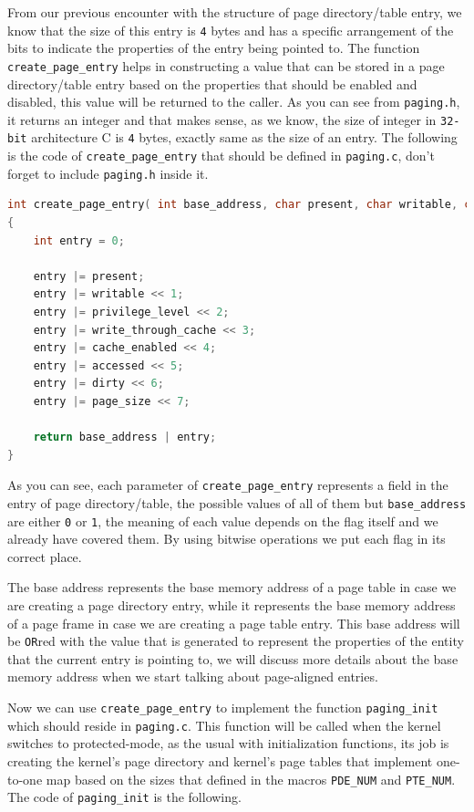 From our previous encounter with the structure of page directory/table
entry, we know that the size of this entry is \lstinline!4! bytes and
has a specific arrangement of the bits to indicate the properties of the
entry being pointed to. The function \lstinline!create_page_entry! helps
in constructing a value that can be stored in a page directory/table
entry based on the properties that should be enabled and disabled, this
value will be returned to the caller. As you can see from
\lstinline!paging.h!, it returns an integer and that makes sense, as we
know, the size of integer in \lstinline!32-bit! architecture C is
\lstinline!4! bytes, exactly same as the size of an entry. The following
is the code of \lstinline!create_page_entry! that should be defined in
\lstinline!paging.c!, don't forget to include \lstinline!paging.h!
inside it.

\begin{lstlisting}[language=C]
int create_page_entry( int base_address, char present, char writable, char privilege_level, char cache_enabled, char write_through_cache, char accessed, char page_size, char dirty )
{
    int entry = 0;
    
    entry |= present;
    entry |= writable << 1;
    entry |= privilege_level << 2;
    entry |= write_through_cache << 3;
    entry |= cache_enabled << 4;
    entry |= accessed << 5;
    entry |= dirty << 6;
    entry |= page_size << 7;
    
    return base_address | entry;
}
\end{lstlisting}

As you can see, each parameter of \lstinline!create_page_entry!
represents a field in the entry of page directory/table, the possible
values of all of them but \lstinline!base_address! are either
\lstinline!0! or \lstinline!1!, the meaning of each value depends on the
flag itself and we already have covered them. By using bitwise
operations we put each flag in its correct place.

The base address represents the base memory address of a page table in
case we are creating a page directory entry, while it represents the
base memory address of a page frame in case we are creating a page table
entry. This base address will be \lstinline!OR!red with the value that
is generated to represent the properties of the entity that the current
entry is pointing to, we will discuss more details about the base memory
address when we start talking about page-aligned entries.

Now we can use \lstinline!create_page_entry! to implement the function
\lstinline!paging_init! which should reside in \lstinline!paging.c!.
This function will be called when the kernel switches to protected-mode,
as the usual with initialization functions, its job is creating the
kernel's page directory and kernel's page tables that implement
one-to-one map based on the sizes that defined in the macros
\lstinline!PDE_NUM! and \lstinline!PTE_NUM!. The code of
\lstinline!paging_init! is the following.

